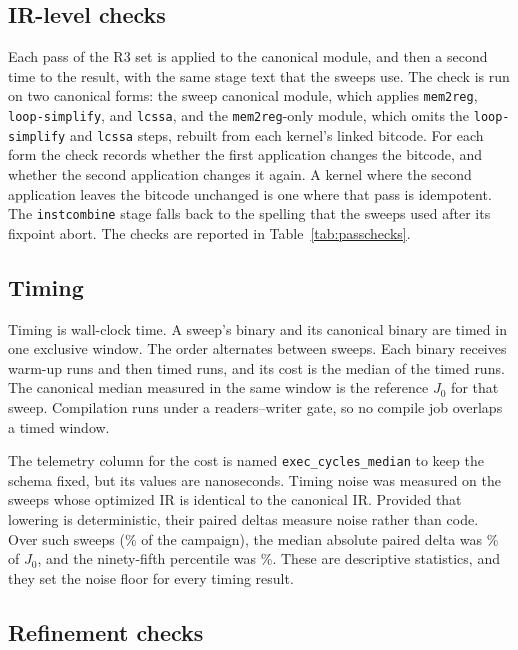 \subsection{IR-level checks}
\label{sec:methods-ir}

Each pass of the R3 set is applied to the canonical module, and then a second time to the result, with the same stage text
that the sweeps use. The check is run on two canonical forms: the sweep canonical module, which applies \texttt{mem2reg}, \texttt{loop-simplify}, and \texttt{lcssa}, and the \texttt{mem2reg}-only module, which omits the \texttt{loop-simplify} and \texttt{lcssa} steps, rebuilt from each kernel's linked bitcode. For each form the check records whether the first application changes the
bitcode, and whether the second application changes it again. A kernel where the second application leaves the bitcode unchanged
is one where that pass is idempotent. The \texttt{instcombine} stage falls back to the spelling that the sweeps used after its
fixpoint abort. The checks are reported in Table~\ref{tab:passchecks}.

\subsection{Timing}
\label{sec:timing}

Timing is wall-clock time. A sweep's binary and its
canonical binary are timed in one exclusive window. The order alternates between sweeps. Each binary receives \WarmupRuns{}
warm-up runs and then \TimedRuns{} timed runs, and its cost is the median of the timed runs. The canonical median measured in
the same window is the reference $J_0$ for that sweep. Compilation runs under a readers--writer gate, so no compile job overlaps
a timed window.

The telemetry column for the cost is named \texttt{exec\_\allowbreak{}cycles\_\allowbreak{}median} to keep the schema fixed, but its values are
nanoseconds. Timing noise was measured on the sweeps whose optimized IR is identical to the canonical IR. Provided that lowering
is deterministic, their paired deltas measure noise rather than code. Over \NoiseSweeps{} such sweeps (\NoiseIdenticalPct{}\% of
the campaign), the median absolute paired delta was \NoiseMedianAbsPct{}\% of $J_0$, and the ninety-fifth percentile was
\NoiseNinetyFifthAbsPct{}\%. These are descriptive statistics, and they set the noise floor for every timing result.

\subsection{Refinement checks}

